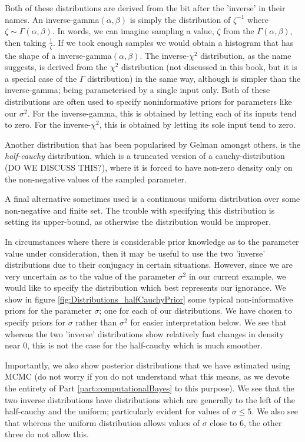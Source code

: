 \documentclass[11pt,fullpage]{book}
\begin{document}
Both of these distributions are derived from the bit after the 'inverse' in their names. An inverse-gamma$(\alpha,\beta)$ is simply the distribution of $\zeta^{-1}$ where $\zeta\sim\Gamma(\alpha,\beta)$. In words, we can imagine sampling a value, $\zeta$ from the $\Gamma(\alpha,\beta)$, then taking $\frac{1}{\zeta}$. If we took enough samples we would obtain a histogram that has the shape of a inverse-gamma$(\alpha,\beta)$. The inverse-$\chi^2$ distribution, as the name suggests, is derived from the $\chi^2$ distribution (not discussed in this book, but it is a special case of the $\Gamma$ distribution) in the same way, although is simpler than the inverse-gamma; being parameterised by a single input only. Both of these distributions are often used to specify noninformative priors for parameters like our $\sigma^2$. For the inverse-gamma, this is obtained by letting each of its inputs tend to zero. For the inverse-$\chi^2$, this is obtained by letting its sole input tend to zero.

Another distribution that has been popularised by Gelman amongst others, is the \textit{half-cauchy} distribution, which is a truncated version of a cauchy-distribution (DO WE DISCUSS THIS?), where it is forced to have non-zero density only on the non-negative values of the sampled parameter.

A final alternative sometimes used is a continuous uniform distribution over some non-negative and finite set. The trouble with specifying this distribution is setting its upper-bound, as otherwise the distribution would be improper.

In circumstances where there is considerable prior knowledge as to the parameter value under consideration, then it may be useful to use the two 'inverse' distributions due to their conjugacy in certain situations.  However, since we are very uncertain as to the value of the parameter $\sigma^2$ in our current example, we would like to specify the distribution which best represents our ignorance. We show in figure \ref{fig:Distributions_halfCauchyPrior} some typical non-informative priors for the parameter $\sigma$; one for each of our distributions. We have chosen to specify priors for $\sigma$ rather than $\sigma^2$ for easier interpretation below. We see that whereas the two 'inverse' distributions show relatively fast changes in density near 0, this is not the case for the half-cauchy which is much smoother.

Importantly, we also show posterior distributions that we have estimated using MCMC (do not worry if you do not understand what this means, as we devote the entirety of Part \ref{part:computationalBayes} to this purpose). We see that the two inverse distributions have distributions which are generally to the left of the half-cauchy and the uniform; particularly evident for values of $\sigma\leq 5$. We also see that whereas the uniform distribution allows values of $\sigma$ close to 6, the other three do not allow this. 
\end{document}
